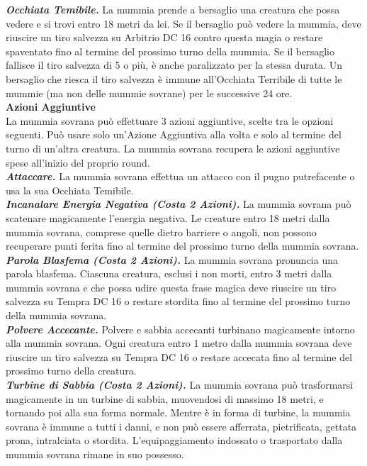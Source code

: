 \begin{multicols}{2}
\emph{\textbf{Occhiata Temibile.}} La mummia prende a bersaglio una creatura che possa vedere e si trovi entro 18 metri da lei. Se il bersaglio può vedere la mummia, deve riuscire un tiro salvezza su Arbitrio DC 16 contro questa magia o restare spaventato fino al termine del prossimo turno della mummia. Se il bersaglio fallisce il tiro salvezza di 5 o più, è anche paralizzato per la stessa durata. Un bersaglio che riesca il tiro salvezza è immune all'Occhiata Terribile di tutte le mummie (ma non delle mummie sovrane) per le successive 24 ore.\\

\textbf{Azioni Aggiuntive}\\

La mummia sovrana può effettuare 3 azioni aggiuntive, scelte tra le opzioni seguenti. Può usare solo un'Azione Aggiuntiva alla volta e solo al termine del turno di un'altra creatura. La mummia sovrana recupera le azioni aggiuntive spese all'inizio del proprio round.\\

\emph{\textbf{Attaccare.}} La mummia sovrana effettua un attacco con il pugno putrefacente o usa la sua Occhiata Temibile.\\

\emph{\textbf{Incanalare Energia Negativa (Costa 2 Azioni).}} La mummia sovrana può scatenare magicamente l'energia negativa. Le creature entro 18 metri dalla mummia sovrana, comprese quelle dietro barriere o angoli, non possono recuperare punti ferita fino al termine del prossimo turno della mummia sovrana.\\

\emph{\textbf{Parola Blasfema (Costa 2 Azioni).}} La mummia sovrana pronuncia una parola blasfema. Ciascuna creatura, esclusi i non morti, entro 3 metri dalla mummia sovrana e che possa udire questa frase magica deve riuscire un tiro salvezza su Tempra DC 16 o restare stordita fino al termine del prossimo turno della mummia sovrana.\\

\emph{\textbf{Polvere Accecante.}} Polvere e sabbia accecanti turbinano magicamente intorno alla mummia sovrana. Ogni creatura entro 1 metro dalla mummia sovrana deve riuscire un tiro salvezza su Tempra DC 16 o restare accecata fino al termine del prossimo turno della creatura.\\

\emph{\textbf{Turbine di Sabbia (Costa 2 Azioni).}} La mummia sovrana può trasformarsi magicamente in un turbine di sabbia, muovendosi di massimo 18 metri, e tornando poi alla sua forma normale. Mentre è in forma di turbine, la mummia sovrana è immune a tutti i danni, e non può essere afferrata, pietrificata, gettata prona, intralciata o stordita. L'equipaggiamento indossato o trasportato dalla mummia sovrana rimane in suo possesso.\\


\end{multicols}
